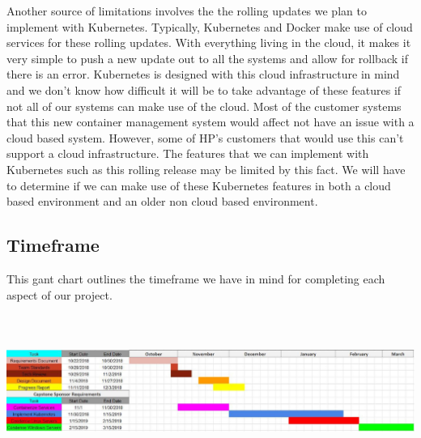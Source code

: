 \documentclass[onecolumn, draftclsnofoot,10pt, compsoc]{IEEEtran}
\begin{document}
Another source of limitations involves the the rolling updates we plan to implement with Kubernetes. Typically, Kubernetes and Docker make use of cloud services for these rolling updates. With everything living in the cloud, it makes it very simple to push a new update out to all the systems and allow for rollback if there is an error. Kubernetes is designed with this cloud infrastructure in mind and we don’t know how difficult it will be to take advantage of these features if not all of our systems can make use of the cloud. Most of the customer systems that this new container management system would affect not have an issue with a cloud based system. However, some of HP’s customers that would use this can’t support a cloud infrastructure. The features that we can implement with Kubernetes such as this rolling release may be limited by this fact. We will have to determine if we can make use of these Kubernetes features in both a cloud based environment and an older non cloud based environment. 

\subsection{Timeframe}

This gant chart outlines the timeframe we have in mind for completing each aspect of our project.
\begin{center}
    \includegraphics[width=\textwidth, height=5cm]{gant.eps}
\end{center}





\end{document}
